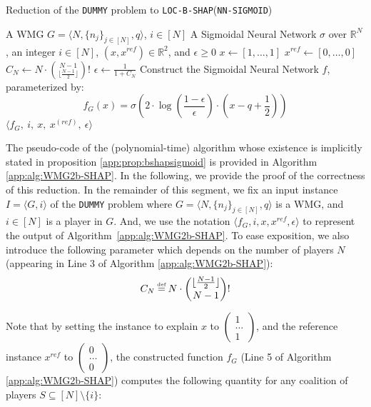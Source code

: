 \begin{algorithm}
\caption{Reduction of the \texttt{DUMMY} problem to \texttt{LOC-B-SHAP}(\texttt{NN-SIGMOID})}
\label{app:alg:WMG2b-SHAP}
\begin{algorithmic}[1]
\REQUIRE A WMG $G = \langle N, \{n_{j}\}_{j \in [N]},q\rangle$, $i \in [N]$
\ENSURE A Sigmoidal Neural Network $\sigma$ over $\mathbb{R}^{N}$, an integer $i \in [N]$, $(x,x^{ref}) \in \mathbb{R}^{2}$, and $\epsilon \geq 0$ 
\STATE $x \leftarrow [1 , \ldots , 1]$
\STATE $x^{ref} \leftarrow [0, \ldots , 0]$
\STATE $C_{N} \leftarrow N \cdot \binom{N-1}{\lfloor \frac{N-1}{2} \rfloor}!$
\STATE $\epsilon \leftarrow \frac{1}{1 + C_{N}}$
\STATE Construct the Sigmoidal Neural Network $f$, parameterized by:
$$f_{G}(x) = \sigma(2 \cdot \log(\frac{1-\epsilon}{\epsilon}) \cdot (x - q + \frac{1}{2}))$$
\RETURN $\langle f_{G},~i,~x,~x^{(ref)},~\epsilon\rangle$
\end{algorithmic}
\end{algorithm}

The pseudo-code of the (polynomial-time) algorithm whose existence is implicitly stated in proposition \ref{app:prop:bshapsigmoid} is provided in Algorithm \ref{app:alg:WMG2b-SHAP}. In the following, we provide the proof of the correctness of this reduction. In the remainder of this segment, we fix an input instance $I = \langle G,i\rangle $ of the \texttt{DUMMY} problem where $G = \langle N, \{n_{j}\}_{j \in [N]}, q\rangle$ is a WMG, and $i \in [N]$ is a player in $G$. And, we use the notation $\langle f_{G}, i, x,x^{ref}, \epsilon\rangle$ to represent the output of Algorithm~\ref{app:alg:WMG2b-SHAP}. To ease exposition, we also introduce the following parameter which depends on the number of players $N$ (appearing in Line 3 of Algorithm \ref{app:alg:WMG2b-SHAP}): 
$$C_{N} \myeq N \cdot \binom{\lfloor \frac{N-1}{2} \rfloor}{N-1}!$$

Note that by setting the instance to explain $x$ to $\begin{pmatrix} 1 \\ \ldots \\ 1\end{pmatrix}$, and the reference instance $x^{ref}$ to $\begin{pmatrix}
    0 \\ \ldots \\ 0
\end{pmatrix}$, the constructed function $f_{G}$ (Line 5 of Algorithm \ref{app:alg:WMG2b-SHAP}) computes the following quantity for any coalition of players $S \subseteq [N] \setminus \{i\}$:

